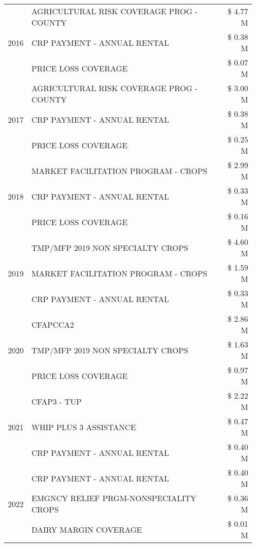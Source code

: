 \begin{tabular}{llr}
\cline{1-3}
\multirow[t]{3}{*}{2016} & AGRICULTURAL RISK COVERAGE PROG - COUNTY & \$ 4.77 M \\
 & CRP PAYMENT - ANNUAL RENTAL & \$ 0.38 M \\
 & PRICE LOSS COVERAGE & \$ 0.07 M \\
\cline{1-3}
\multirow[t]{3}{*}{2017} & AGRICULTURAL RISK COVERAGE PROG - COUNTY & \$ 3.00 M \\
 & CRP PAYMENT - ANNUAL RENTAL & \$ 0.38 M \\
 & PRICE LOSS COVERAGE & \$ 0.25 M \\
\cline{1-3}
\multirow[t]{3}{*}{2018} & MARKET FACILITATION PROGRAM - CROPS & \$ 2.99 M \\
 & CRP PAYMENT - ANNUAL RENTAL & \$ 0.33 M \\
 & PRICE LOSS COVERAGE & \$ 0.16 M \\
\cline{1-3}
\multirow[t]{3}{*}{2019} & TMP/MFP 2019 NON SPECIALTY CROPS & \$ 4.60 M \\
 & MARKET FACILITATION PROGRAM - CROPS & \$ 1.59 M \\
 & CRP PAYMENT - ANNUAL RENTAL & \$ 0.33 M \\
\cline{1-3}
\multirow[t]{3}{*}{2020} & CFAPCCA2 & \$ 2.86 M \\
 & TMP/MFP 2019 NON SPECIALTY CROPS & \$ 1.63 M \\
 & PRICE LOSS COVERAGE & \$ 0.97 M \\
\cline{1-3}
\multirow[t]{3}{*}{2021} & CFAP3 - TUP & \$ 2.22 M \\
 & WHIP PLUS 3 ASSISTANCE & \$ 0.47 M \\
 & CRP PAYMENT - ANNUAL RENTAL & \$ 0.40 M \\
\cline{1-3}
\multirow[t]{3}{*}{2022} & CRP PAYMENT - ANNUAL RENTAL & \$ 0.40 M \\
 & EMGNCY RELIEF PRGM-NONSPECIALITY CROPS & \$ 0.36 M \\
 & DAIRY MARGIN COVERAGE & \$ 0.01 M \\
\cline{1-3}
\bottomrule
\end{tabular}
